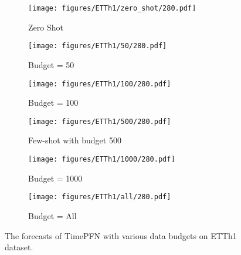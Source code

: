\begin{figure*}[htp]
\centering

\begin{subfigure}{0.32\textwidth}
\texttt{[image: figures/ETTh1/zero\_shot/280.pdf]}
\caption{Zero Shot}
\end{subfigure}\hfill
\begin{subfigure}{0.32\textwidth}
\texttt{[image: figures/ETTh1/50/280.pdf]}
\caption{Budget = 50}
\end{subfigure}\hfill
\begin{subfigure}{0.32\textwidth}
\texttt{[image: figures/ETTh1/100/280.pdf]}
\caption{Budget = 100}
\end{subfigure}

\begin{subfigure}{0.32\textwidth}
\texttt{[image: figures/ETTh1/500/280.pdf]}
\caption{Few-shot with budget 500}
\end{subfigure}\hfill
\begin{subfigure}{0.32\textwidth}
\texttt{[image: figures/ETTh1/1000/280.pdf]}
\caption{Budget = 1000}
\end{subfigure}\hfill
\begin{subfigure}{0.32\textwidth}
\texttt{[image: figures/ETTh1/all/280.pdf]}
\caption{Budget = All}
\end{subfigure}

\caption{The forecasts of TimePFN with various data budgets on ETTh1 dataset. }
\label{fig:etth1_280}
\end{figure*}